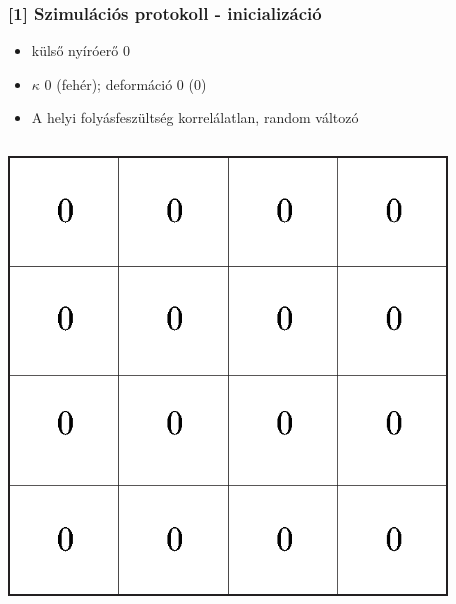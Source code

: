 \documentclass[12pt]{beamer}
\begin{document}
\begin{frame}
\frametitle{[1] Szimulációs protokoll - inicializáció}
\begin{itemize}
\item külső nyíróerő 0
\item {} $\kappa$ 0 (fehér); deformáció 0 (0)
\item<3>  A helyi folyásfeszültség korrelálatlan, random változó
\end{itemize}

\begin{columns}
\begin{column}{0.5\textwidth}
  \begin{center} 
  \includegraphics[width=0.91\textwidth]{figs/mean_field_empty.eps}
  \end{center}
\end{column}
\begin{column}{0.5\textwidth}  %
  \begin{center} 

\end{center}
\end{column}
\end{columns}
\end{frame}
\end{document}
